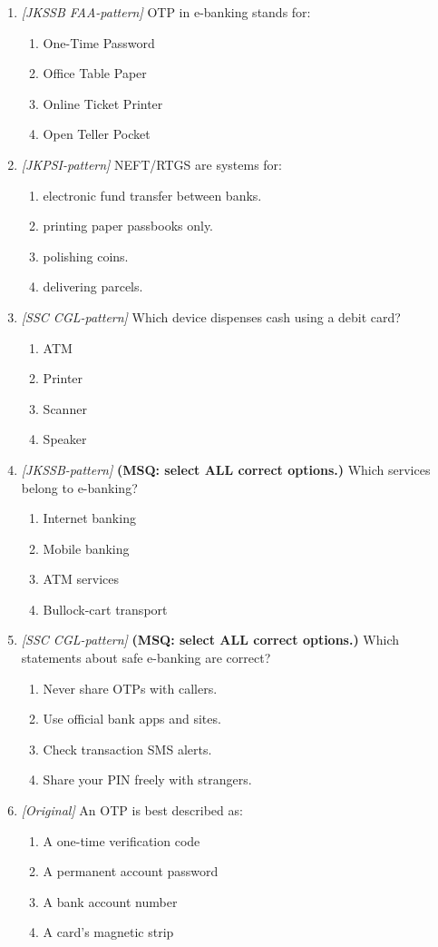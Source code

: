 \begin{enumerate}[label=\textbf{Q\arabic*.}, leftmargin=*]
\item \textit{[JKSSB FAA-pattern]} OTP in e-banking stands for:
  \begin{enumerate}[label=\Alph*.]
    \item One-Time Password
    \item Office Table Paper
    \item Online Ticket Printer
    \item Open Teller Pocket
  \end{enumerate}
\item \textit{[JKPSI-pattern]} NEFT/RTGS are systems for:
  \begin{enumerate}[label=\Alph*.]
    \item electronic fund transfer between banks.
    \item printing paper passbooks only.
    \item polishing coins.
    \item delivering parcels.
  \end{enumerate}
\item \textit{[SSC CGL-pattern]} Which device dispenses cash using a debit card?
  \begin{enumerate}[label=\Alph*.]
    \item ATM
    \item Printer
    \item Scanner
    \item Speaker
  \end{enumerate}
\item \textit{[JKSSB-pattern]} \textbf{(MSQ: select ALL correct options.)} Which services belong to e-banking?
  \begin{enumerate}[label=\Alph*.]
    \item Internet banking
    \item Mobile banking
    \item ATM services
    \item Bullock-cart transport
  \end{enumerate}
\item \textit{[SSC CGL-pattern]} \textbf{(MSQ: select ALL correct options.)} Which statements about safe e-banking are correct?
  \begin{enumerate}[label=\Alph*.]
    \item Never share OTPs with callers.
    \item Use official bank apps and sites.
    \item Check transaction SMS alerts.
    \item Share your PIN freely with strangers.
  \end{enumerate}
\item \textit{[Original]} An OTP is best described as:
  \begin{enumerate}[label=\Alph*.]
\item A one-time verification code
   \item A permanent account password
   \item A bank account number
   \item A card's magnetic strip
  \end{enumerate}


\end{enumerate}

